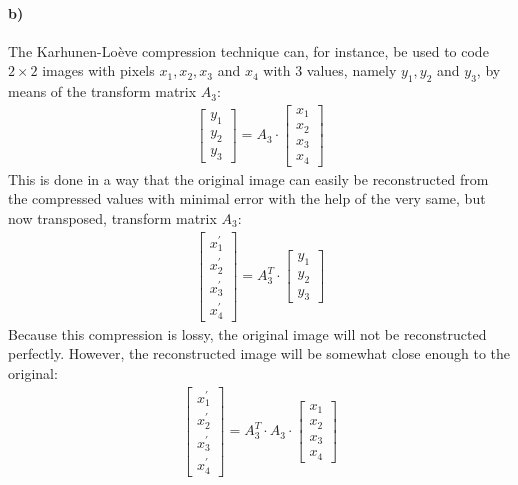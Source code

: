 \documentclass[a4paper,twocolumn]{article}
\begin{document}
	\paragraph{b)} %
	The Karhunen-Loève compression technique can, for instance, be used to code $2 \times 2$ images with pixels $x_1, x_2, x_3$ and $x_4$ with 3 values, namely $y_1, y_2$ and $y_3$, by means of the transform matrix $A_3$:
	\begin{align*}
	\begin{bmatrix}
	y_1 \\ y_2 \\ y_3
	\end{bmatrix}
	= A_3 \cdot 
	\begin{bmatrix}
	x_1 \\ x_2 \\ x_3 \\ x_4
	\end{bmatrix}
	\end{align*}
	This is done in a way that the original image can easily be reconstructed from the compressed values with minimal error with the help of the very same, but now transposed, transform matrix $A_3$:
	\begin{align*}
	\begin{bmatrix}
	x_1^{\prime} \\ x_2^{\prime} \\ x_3^{\prime} \\ x_4^{\prime}
	\end{bmatrix}
	= A_3^T \cdot
	\begin{bmatrix}
	y_1 \\ y_2 \\ y_3
	\end{bmatrix}
	\end{align*}
	Because this compression is lossy, the original image will not be reconstructed perfectly. However, the reconstructed image will be somewhat close enough to the original: 
	\begin{align*}
	\begin{bmatrix}
	x_1^{\prime} \\ x_2^{\prime} \\ x_3^{\prime} \\ x_4^{\prime}
	\end{bmatrix}
	= A_3^T \cdot A_3 \cdot 
	\begin{bmatrix}
	x_1 \\ x_2 \\ x_3 \\ x_4
	\end{bmatrix} 
	\end{align*}
\end{document}
